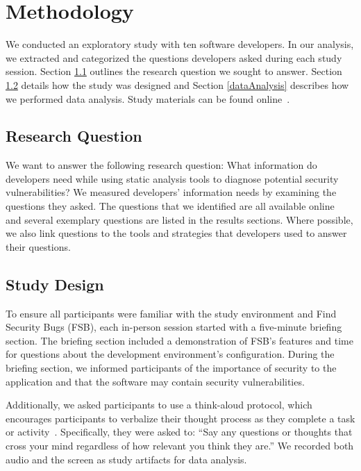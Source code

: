 \documentclass{sig-alternate}
\begin{document}
\section{Methodology}
\label{sec:meth}
We conducted an exploratory study with ten software developers. In our analysis, we extracted and categorized the questions developers asked during each study session. 
Section \ref{rqs} outlines the research question we sought to answer. 
Section \ref{studyDesign} details how the study was designed and Section \ref{dataAnalysis} describes how we performed data analysis.
Study materials can be found online~\cite{ExperimentalMaterials}.

\subsection{Research Question}
\label{rqs}
We want to answer the following research question: What information do developers need while using static analysis tools to diagnose potential security vulnerabilities? 
We measured developers' information needs by examining the questions they asked.
The questions that we identified are all available online~\cite{ExperimentalMaterials} and several exemplary questions are listed in the results sections.
Where possible, we also link questions to the tools and strategies that developers used to answer their questions.


\subsection{Study Design}
\label{studyDesign}
To ensure all participants were familiar with the study environment and Find Security Bugs (FSB),
each in-person session started with a five-minute briefing section.
The briefing section included a demonstration of FSB's features and time for questions about the development environment's configuration.
During the briefing section, we informed participants of the importance of security to the application and that the software may contain security vulnerabilities.

Additionally, we asked participants to use a think-aloud protocol, which encourages  participants to verbalize their thought process as they complete a task or activity~\cite{nielsen2002getting}. 
Specifically, they were asked to: ``Say any questions or thoughts that cross your mind regardless of how relevant you think they are.''
We recorded both audio and the screen as study artifacts for data analysis.
\end{document}
